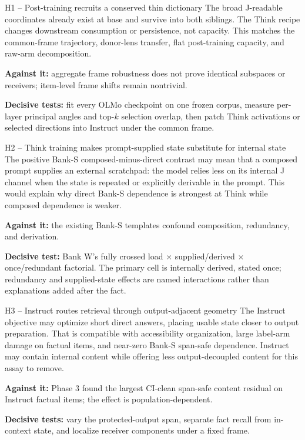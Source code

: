 \documentclass[11pt]{article}
\begin{document}
\begin{hypbox}{H1 -- Post-training recruits a conserved thin dictionary}
The broad J-readable coordinates already exist at base and survive into both
siblings. The Think recipe changes downstream consumption or persistence, not
capacity. This matches the common-frame trajectory, donor-lens transfer, flat
post-training capacity, and raw-arm decomposition.

\textbf{Against it:} aggregate frame robustness does not prove identical
subspaces or receivers; item-level frame shifts remain nontrivial.

\textbf{Decisive tests:} fit every OLMo checkpoint on one frozen corpus,
measure per-layer principal angles and top-$k$ selection overlap, then patch
Think activations or selected directions into Instruct under the common frame.
\end{hypbox}

\begin{hypbox}{H2 -- Think training makes prompt-supplied state substitute for internal state}
The positive Bank-S composed-minus-direct contrast may mean that a composed
prompt supplies an external scratchpad: the model relies less on its internal
J channel when the state is repeated or explicitly derivable in the prompt.
This would explain why direct Bank-S dependence is strongest at Think while
composed dependence is weaker.

\textbf{Against it:} the existing Bank-S templates confound composition,
redundancy, and derivation.

\textbf{Decisive test:} Bank W's fully crossed load $\times$
supplied/derived $\times$ once/redundant factorial. The primary cell is
internally derived, stated once; redundancy and supplied-state effects are
named interactions rather than explanations added after the fact.
\end{hypbox}

\begin{hypbox}{H3 -- Instruct routes retrieval through output-adjacent geometry}
The Instruct objective may optimize short direct answers, placing usable state
closer to output preparation. That is compatible with accessibility
organization, large label-arm damage on factual items, and near-zero Bank-S
span-safe dependence. Instruct may contain internal content while offering
less output-decoupled content for this assay to remove.

\textbf{Against it:} Phase 3 found the largest CI-clean span-safe content
residual on Instruct factual items; the effect is population-dependent.

\textbf{Decisive tests:} vary the protected-output span, separate fact recall
from in-context state, and localize receiver components under a fixed frame.
\end{hypbox}
\end{document}
